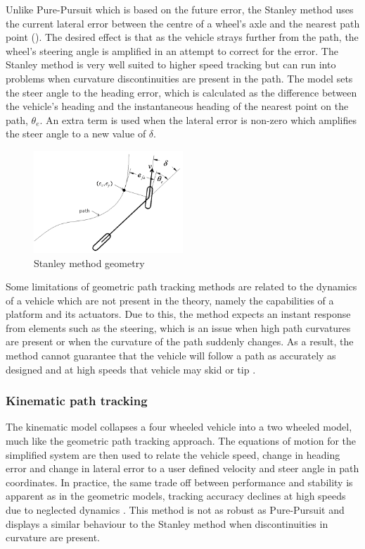 \documentclass[main.tex]{subfiles}
\begin{document}
Unlike Pure-Pursuit which is based on the future error, the Stanley method uses the current lateral error between the centre of a wheel's axle and the nearest path point (). The desired effect is that as the vehicle strays further from the path, the wheel's steering angle is amplified in an attempt to correct for the error. The Stanley method is very well suited to higher speed tracking but can run into problems when curvature discontinuities are present in the path. The model sets the steer angle to the heading error, which is calculated as the difference between the vehicle's heading and the instantaneous heading of the nearest point on the path, $\theta_e$. An extra term is used when the lateral error is non-zero which amplifies the steer angle to a new value of $\delta$.
\begin{figure}[ht]
\includegraphics[width=0.5\textwidth]{2-LiteratureReview/stanleyMethod.png}
\centering
\caption[Stanley Method geometry]{Stanley method geometry \parencite{snider2009}} 
\end{figure}

%
%

Some limitations of geometric path tracking methods are related to the dynamics of a vehicle which are not present in the theory, namely the capabilities of a platform and its actuators. Due to this, the method expects an instant response from elements such as the steering, which is an issue when high path curvatures are present or when the curvature of the path suddenly changes. As a result, the method cannot guarantee that the vehicle will follow a path as accurately as designed and at high speeds that vehicle may skid or tip \parencite{coulter1992}.

\subsubsection{Kinematic path tracking}
The kinematic model collapses a four wheeled vehicle into a two wheeled model, much like the geometric path tracking approach. The equations of motion for the simplified system are then used to relate the vehicle speed, change in heading error and change in lateral error to a user defined velocity and steer angle in path coordinates. In practice, the same trade off between performance and stability is apparent as in the geometric models, tracking accuracy declines at high speeds due to neglected dynamics \parencite{snider2009}. This method is not as robust as Pure-Pursuit and displays a similar behaviour to the Stanley method when discontinuities in curvature are present.
\end{document}
